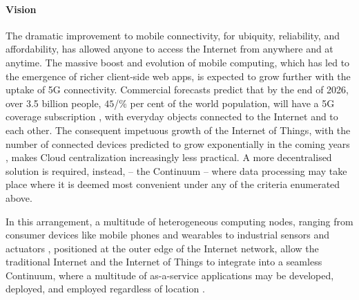 \paragraph{Vision}
The dramatic improvement to mobile connectivity, for ubiquity, reliability, and affordability, has allowed anyone to access the Internet from anywhere and at anytime.
The massive boost and evolution of mobile computing, which has led to the emergence of richer client-side web apps, is expected to grow further with the uptake of 5G connectivity. 
Commercial forecasts predict that by the end of 2026,  over 3.5 billion people, $45$/\% per cent of the world population, will have a 5G coverage subscription \cite{ericsson-5g}, with everyday objects connected to the Internet and to each other. 
The consequent impetuous growth of the Internet of Things, with the number of connected devices predicted to grow exponentially in the coming years \cite{gartner-iot}, makes Cloud centralization increasingly less practical.
A more decentralised solution is required, instead, -- the Continuum -- where data processing may take place where it is deemed most convenient under any of the criteria enumerated above.  

In this arrangement, a multitude of heterogeneous computing nodes, ranging from consumer devices like mobile phones and wearables to industrial sensors and actuators \cite{chen2018edge}, positioned at the outer edge of the Internet network, allow the traditional Internet and the Internet of Things to integrate into a seamless Continuum, where a multitude of as-a-service applications may be developed, deployed, and employed regardless of location \cite{beckman2020harnessing}.

